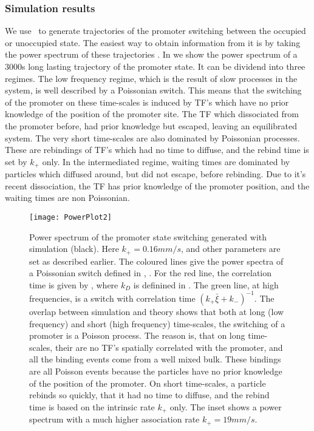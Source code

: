 \subsubsection{Simulation results}
We use \GFRD\, to generate trajectories of the promoter switching between the occupied or unoccupied state. The easiest way to obtain information from it is by taking the power spectrum of these trajectories \cite{Tkacik2009,VanZon2006}. In  we show the power spectrum of a 3000s long lasting trajectory of the promoter state. It can be dividend into three regimes. The low frequency regime, which is the result of slow processes in the system, is well described by a Poissonian switch. This means that the switching of the promoter on these time-scales is induced by TF's which have no prior knowledge of the position of the promoter site. The TF which dissociated from the promoter before, had prior knowledge but escaped, leaving an equilibrated system. The very short time-scales are also dominated by Poissonian processes. These are rebindings of TF's which had no time to diffuse, and the rebind time is set by $k_+$ only. In the intermediated regime, waiting times are dominated by particles which diffused around, but did not escape, before rebinding. Due to it's recent dissociation, the TF has prior knowledge of the promoter position, and the waiting times are non Poissonian.

\begin{figure}
\texttt{[image: PowerPlot2]}
\caption{ Power spectrum of the promoter state switching generated with simulation (black). Here $k_+=0.16mm/s$, and other parameters are set as described earlier. The coloured lines give the power spectra of a Poissonian switch defined in , . For the red line, the correlation time is given by , where $k_D$ is definined in . The green line, at high frequencies, is a switch with correlation time $(k_+ \bar{\xi}+k_-)^{-1}$. The overlap between simulation and theory shows that both at long (low frequency) and short (high frequency) time-scales, the switching of a promoter is a Poisson process. The reason is, that on long time-scales, their are no TF's spatially correlated with the promoter, and all the binding events come from a well mixed bulk. These bindings are all Poisson events because the particles have no prior knowledge of the position of the promoter. On short time-scales, a particle rebinds so quickly, that it had no time to diffuse, and the rebind time is based on the intrinsic rate $k_+$ only. The inset shows a power spectrum with a much higher association rate $k_+=19 mm/s$. 
}
\end{figure}

